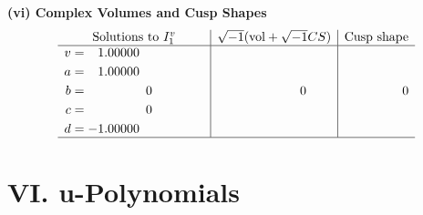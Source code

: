 \documentclass[1p]{elsarticle_modified}
\theoremstyle{definition}
\newcommand{\I}{\sqrt{-1}}
\begin{document}
\newpage\flushleft \textbf{(vi) Complex Volumes and Cusp Shapes}
$$\begin{array}{c|c|c}  
\text{Solutions to }I^v_{1}& \I (\text{vol} + \sqrt{-1}CS) & \text{Cusp shape}\\
 \hline 
\begin{aligned}
v &= \phantom{-}1.00000\phantom{ +0.000000I} \\
a &= \phantom{-}1.00000\phantom{ +0.000000I} \\
b &= \phantom{-0.000000 } 0 \\
c &= \phantom{-0.000000 } 0 \\
d &= -1.00000\phantom{ +0.000000I}\end{aligned}
 & \phantom{-0.000000 } 0 & \phantom{-0.000000 } 0\\
 \hline 
 \end{array}$$\newpage
\newpage\renewcommand{\arraystretch}{1}
\centering \section*{ VI. u-Polynomials}
\end{document}
